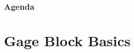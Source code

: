 
\def\PresTitle{Gauge Blocks}  %
\def\PresSubtitle{Gauges and Measurement}         %
\def\PresAuthor{Brad Peirson}               %
\def\PresInstitute{College of Information Technology and Engineering}       %
\def\PresDate{}                             %
\def\PresKeywords{}                         %





\maketitle              %

\begin{frame}
    \frametitle{Agenda}
    \begingroup
        \setlength{\parskip}{0.3em} 
        
        
        \setcounter{tocdepth}{1} %
    \tableofcontents
    \setcounter{tocdepth}{2} %
    \endgroup
\end{frame}

\section{Gage Block Basics}

